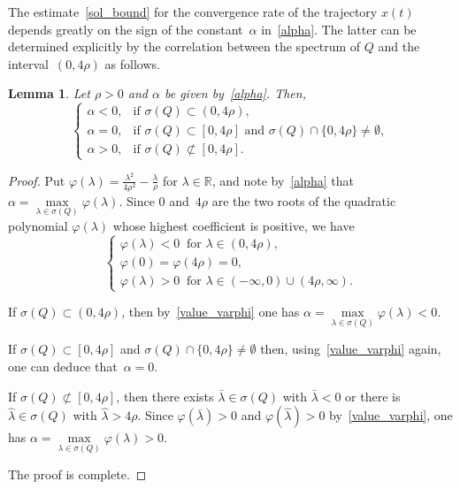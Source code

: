 \documentclass[11pt]{article}
\newtheorem{lemma}[theorem]{Lemma}
\theoremstyle{definition}
\theoremstyle{remark}
\begin{document}
The estimate~\eqref{sol_bound} for the convergence rate of the trajectory $x(t)$ depends greatly on the sign of the constant~$\alpha$ in~\eqref{alpha}. The latter can be determined explicitly by the correlation between the spectrum of $Q$ and the interval~$(0,4\rho)$ as follows.
\begin{lemma}\label{lem4}
	Let $\rho>0$ and $\alpha$ be given by~\eqref{alpha}. Then,
$$
	\begin{cases}
		\alpha <0, & \text{if } \sigma(Q)\subset(0,4\rho),\\[2mm]
		\alpha =0, & \text{if } \sigma(Q)\subset[0,4\rho] \text{ and } \sigma(Q)\cap\{0,4\rho\}\neq\emptyset,\\[2mm]
		\alpha >0, & \text{if } \sigma(Q)\not\subset[0,4\rho].
	\end{cases}
$$
\end{lemma}
\begin{proof}
	Put
	$\varphi(\lambda)=\frac{\lambda^2}{4\rho^2}-\frac{\lambda}{\rho}$ for $\lambda\in\mathbb{R}$, and note by~\eqref{alpha} that  $\alpha=\max\limits_{\lambda\in\sigma(Q)}\varphi(\lambda)$. Since $0$ and~$4\rho$ are the two roots of the quadratic polynomial $\varphi(\lambda)$ whose highest coefficient is positive, we have
	\begin{equation}\label{value_varphi}
		\begin{cases}
			\varphi(\lambda)<0 \ \text{ for } \lambda\in(0,4\rho), \\
			\varphi(0)=\varphi(4\rho)=0, \\
			\varphi(\lambda)>0 \ \text{ for } \lambda\in(-\infty,0)\cup(4\rho,\infty).
		\end{cases}
	\end{equation}
	
If $\sigma(Q)\subset(0,4\rho)$, then by~\eqref{value_varphi} one has $\alpha=\max\limits_{\lambda\in\sigma(Q)}\varphi(\lambda)<0$.

If $\sigma(Q)\subset[0,4\rho]$ and $\sigma(Q)\cap\{0,4\rho\}\neq\emptyset$ then, using~\eqref{value_varphi} again, one can deduce that~$\alpha=0$. 

If $\sigma(Q)\not\subset[0,4\rho]$, then there exists 
 $\bar\lambda\in\sigma(Q)$ with $\bar\lambda<0$ or there is  $\hat\lambda\in\sigma(Q)$ with $\hat\lambda>4\rho$. Since $\varphi(\bar\lambda)>0$ and $\varphi(\hat\lambda)>0$ by~\eqref{value_varphi}, one has
$
\alpha=\max\limits_{\lambda\in\sigma(Q)}\varphi(\lambda)>0.
$

The proof is complete.
\end{proof}
\end{document}
